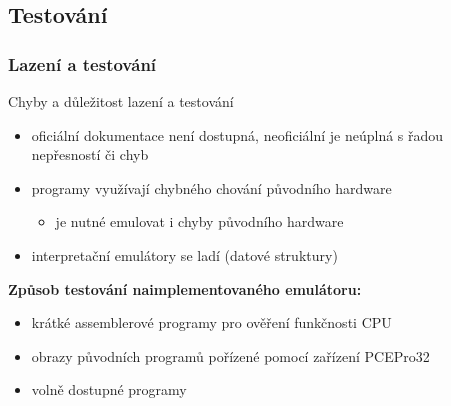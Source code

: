\documentclass[10pt]{beamer}
\begin{document}
% 
\subsection{Testování}
\begin{frame}
\frametitle{Lazení a testování}
\begin{block}{Chyby a důležitost lazení a testování}
\begin{itemize}
	\item oficiální dokumentace není dostupná, neoficiální je neúplná s řadou
		nepřesností či chyb
	\item programy využívají chybného chování původního hardware
	\begin{itemize}
		\item je nutné emulovat i chyby původního hardware
	\end{itemize}
	\item interpretační emulátory se ladí  (datové struktury)
\end{itemize}
\end{block}
\vglue 2.5mm
{\bf Způsob testování naimplementovaného emulátoru:} \\
\begin{itemize}
	\item krátké assemblerové programy pro ověření funkčnosti CPU
	\item obrazy původních programů pořízené pomocí zařízení PCEPro32
	\item volně dostupné  programy
\end{itemize}
\end{frame}

\end{document}
